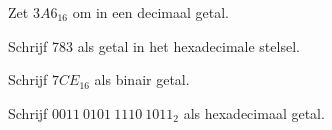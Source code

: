 \begin{opdracht}
Zet $3A6_{16}$ om in een decimaal getal.
\end{opdracht}

\begin{opdracht}
Schrijf 783 als getal in het hexadecimale stelsel.
\end{opdracht}

\begin{opdracht}
Schrijf $7CE_{16}$ als binair getal.
\end{opdracht}

\begin{opdracht}
Schrijf $0011\ 0101\ 1110\ 1011_2$ als hexadecimaal getal.
\end{opdracht}





